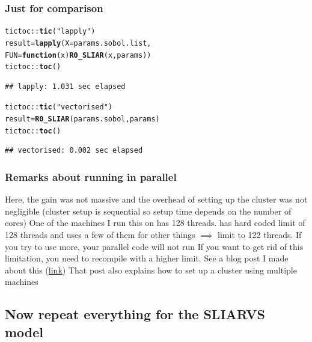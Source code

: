 \documentclass[aspectratio=169]{beamer}\usepackage[]{graphicx}\usepackage[]{xcolor}
\makeatletter
\newcommand{\hlsng}[1]{\textcolor[rgb]{0.192,0.494,0.8}{#1}}%
\newcommand{\hlopt}[1]{\textcolor[rgb]{0,0,0}{#1}}%
\newcommand{\hldef}[1]{\textcolor[rgb]{0.345,0.345,0.345}{#1}}%
\newcommand{\hlkwa}[1]{\textcolor[rgb]{0.161,0.373,0.58}{\textbf{#1}}}%
\newcommand{\hlkwb}[1]{\textcolor[rgb]{0.69,0.353,0.396}{#1}}%
\newcommand{\hlkwc}[1]{\textcolor[rgb]{0.333,0.667,0.333}{#1}}%
\newcommand{\hlkwd}[1]{\textcolor[rgb]{0.737,0.353,0.396}{\textbf{#1}}}%
\newenvironment{kframe}{%
 \def\at@end@of@kframe{}%
 \ifinner\ifhmode%
  \def\at@end@of@kframe{\end{minipage}}%
  \begin{minipage}{\columnwidth}%
 \fi\fi%
 \def\FrameCommand##1{\hskip\@totalleftmargin \hskip-\fboxsep
 \colorbox{shadecolor}{##1}\hskip-\fboxsep
     \hskip-\linewidth \hskip-\@totalleftmargin \hskip\columnwidth}%
 \MakeFramed {\advance\hsize-\width
   \@totalleftmargin\z@ \linewidth\hsize
   \@setminipage}}%
 {\par\unskip\endMakeFramed%
 \at@end@of@kframe}
\newenvironment{knitrout}{}{} %
\makeatother
\begin{document}
\begin{frame}[fragile]\frametitle{Just for comparison}
\begin{knitrout}
\color{fgcolor}\begin{kframe}
\begin{alltt}
\hldef{tictoc}\hlopt{::}\hlkwd{tic}\hldef{(}\hlsng{"lapply"}\hldef{)}
\hldef{result} \hlkwb{=} \hlkwd{lapply}\hldef{(}\hlkwc{X} \hldef{= params.sobol.list,}
                \hlkwc{FUN} \hldef{=}  \hlkwa{function}\hldef{(}\hlkwc{x}\hldef{)} \hlkwd{R0_SLIAR}\hldef{(x, params))}
\hldef{tictoc}\hlopt{::}\hlkwd{toc}\hldef{()}
\end{alltt}
\begin{verbatim}
## lapply: 1.031 sec elapsed
\end{verbatim}
\begin{alltt}
\hldef{tictoc}\hlopt{::}\hlkwd{tic}\hldef{(}\hlsng{"vectorised"}\hldef{)}
\hldef{result} \hlkwb{=} \hlkwd{R0_SLIAR}\hldef{(params.sobol, params)}
\hldef{tictoc}\hlopt{::}\hlkwd{toc}\hldef{()}
\end{alltt}
\begin{verbatim}
## vectorised: 0.002 sec elapsed
\end{verbatim}
\end{kframe}
\end{knitrout}
\end{frame}


\begin{frame}\frametitle{Remarks about running in parallel}
Here, the gain was not massive and the overhead of setting up the cluster was not negligible (cluster setup is sequential so setup time depends on the number of cores)
\vfill
One of the machines I run this on has 128 threads.  has hard coded limit of 128 threads and uses a few of them for other things $\implies$ limit to 122 threads. If you try to use more, your parallel code will not run
\vfill
If you want to get rid of this limitation, you need to recompile  with a higher limit. See a blog post I made about this (\href{https://julien-arino.github.io/blog/2023/R-on-raspberri-pi-and-more-than-128-threads/}{link})
\vfill
That post also explains how to set up a cluster using multiple machines
\end{frame}

\subsection{Now repeat everything for the SLIARVS model}
\end{document}
